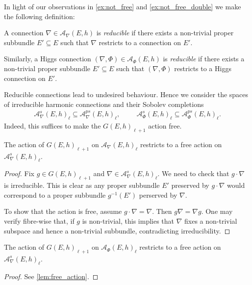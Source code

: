 \documentclass[12pt]{ociamthesis}  %
\begin{document}
In light of our observations in \ref{ex:not_free} and \ref{ex:not_free_double}
we make the following definition:

\begin{definition}
  A connection $\nabla\in \mathcal A_\nabla (E,h)$ is \emph{reducible} if there exists
  a non-trivial proper subbundle $E'\subseteq E$ such that $\nabla$ restricts
  to a connection on $E'$.

  Similarly, a Higgs connection $(\nabla,\Phi)\in \mathcal A_\Phi(E,h)$ is
  \emph{reducible} if there exists a non-trivial proper subbundle $E'\subseteq E$
  such that $(\nabla,\Phi)$ restricts to a Higgs connection on $E'$.
\end{definition}

Reducible connections lead to undesired behaviour. Hence we
consider the spaces of irreducible harmonic connections and their Sobolev
completions
\begin{align*}
  \mathcal A^s_\nabla(E,h)_\ell \subseteq \mathcal A^{ps}_\nabla(E,h)_\ell,\hspace{1cm}
  \mathcal A^s_\Phi(E,h)_\ell \subseteq \mathcal A^{ps}_\Phi(E,h)_\ell.
\end{align*}
Indeed, this suffices to make the $G(E,h)_{\ell+1}$ action free.

\begin{lemma}\label{lem:free_action}
  The action of $G(E,h)_{\ell+1}$ on $\mathcal A_\nabla(E,h)_\ell$
  restricts to a free action on $\mathcal A^s_\nabla(E,h)_\ell$.
  \begin{proof}
    Fix $g\in G(E,h)_{\ell+1}$ and $\nabla\in \mathcal A^s_\nabla(E,h)_\ell$.
    We need to check that $g\cdot\nabla$ is irreducible. This is clear
    as any proper subbundle $E'$ preserved by $g\cdot\nabla$ would correspond
    to a proper subbundle $g^{-1}(E')$  perserved by $\nabla$.

    To show that the action is free, assume $g\cdot\nabla = \nabla$.
    Then $g\nabla = \nabla g$. One may verify fibre-wise that, if $g$
    is non-trivial, this implies that $\nabla$ fixes a non-trivial
    subspace and hence a non-trivial subbundle, contradicting irreducibility.
  \end{proof}
\end{lemma}

\begin{lemma}
  The action of $G(E,h)_{\ell+1}$ on $\mathcal A_\Phi(E,h)_\ell$
  restricts to a free action on $\mathcal A^{s}_\nabla(E,h)_\ell$.
  \begin{proof}
    See \ref{lem:free_action}.
  \end{proof}
\end{lemma}
\end{document}

